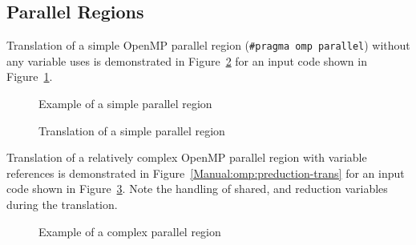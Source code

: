 \subsection{Parallel Regions}

Translation of a simple OpenMP parallel region 
(\lstinline{#pragma omp parallel}) without any variable uses is demonstrated in
Figure~\ref{Manual:omp:hello1-trans} for an input code shown in
Figure~\ref{Manual:omp:hello1}.

\lstset{language=C,basicstyle=\scriptsize}
\lstset{language=C,basicstyle=\scriptsize,numbers=left}
\begin{figure}[htbp]
{\indent
  {\mySmallFontSize
    \begin{latexonly}
    
    \end{latexonly}
    \begin{htmlonly}
    
    \end{htmlonly}
  }
}
\caption{Example of a simple parallel region}
\label{Manual:omp:hello1}
\end{figure}

\begin{figure}[htbp]
{\indent
  {\mySmallFontSize
    \begin{latexonly}
    
    \end{latexonly}
    \begin{htmlonly}
    
    \end{htmlonly}
  }
}
\caption{Translation of a simple parallel region}
\label{Manual:omp:hello1-trans}
\end{figure}

Translation of a relatively complex OpenMP parallel region with variable references is demonstrated in
Figure~\ref{Manual:omp:preduction-trans} for an input code shown in
Figure~\ref{Manual:omp:preduction}. 
Note the handling of shared, and reduction variables during the translation.

\lstset{language=C,basicstyle=\scriptsize}
\begin{figure}[htbp]
{\indent
  {\mySmallFontSize
    \begin{latexonly}
    
    \end{latexonly}
    \begin{htmlonly}
    
    \end{htmlonly}
  }
}
\caption{Example of a complex parallel region}
\label{Manual:omp:preduction}
\end{figure}

